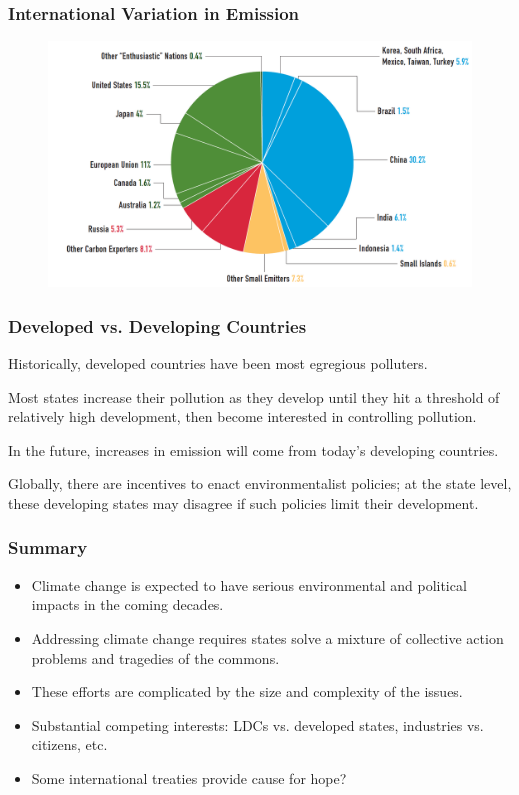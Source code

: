 \documentclass[handout]{beamer}
\begin{document}
\begin{frame} 
	\frametitle{\LARGE{International Variation in Emission}}
	\begin{figure}[ht!]
		\centering
		\includegraphics[width=\textwidth,height=0.8\textheight, keepaspectratio]{./emit_dist.png}
	\end{figure}
\end{frame}

\begin{frame} 
	\frametitle{\LARGE{Developed vs. Developing Countries}}
	\begin{itemize}
		\large{
			\item Historically, developed countries have been most egregious polluters. \pause
			
			\item Most states increase their pollution as they develop until they hit a threshold of relatively high development, then become interested in controlling pollution. \pause
			
			\item In the future, increases in emission will come from today's developing countries. \pause
			
			\item Globally, there are incentives to enact environmentalist policies; at the state level, these developing states may disagree if such policies limit their development.
		}
	\end{itemize}
\end{frame}

\begin{frame} 
	\frametitle{\LARGE{Summary}}
	\begin{itemize}
		\item Climate change is expected to have serious environmental and political impacts in the coming decades. \pause
		\item Addressing climate change requires states solve a mixture of collective action problems and tragedies of the commons. \pause
		\item These efforts are complicated by the size and complexity of the issues. \pause
		\item Substantial competing interests: LDCs vs. developed states, industries vs. citizens, etc. \pause
		\item Some international treaties provide cause for hope?		
	\end{itemize}
\end{frame}
\end{document}
